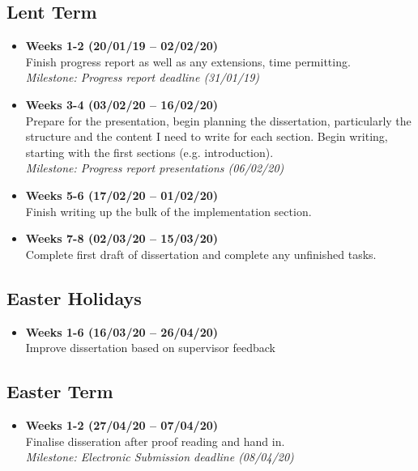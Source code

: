 \subsection*{Lent Term}
\begin{itemize}
      \item \textbf{Weeks 1-2 (20/01/19 -- 02/02/20)}\\ Finish progress report as well as any extensions, time permitting.
            \\ \textit{Milestone: Progress report deadline (31/01/19)}
      \item \textbf{Weeks 3-4 (03/02/20 -- 16/02/20)}\\ Prepare for the presentation, begin planning the dissertation, particularly the structure and the content I need to write for each section. Begin writing, starting with the first sections (e.g. introduction).
            \\ \textit{Milestone: Progress report presentations (06/02/20)}
      \item \textbf{Weeks 5-6 (17/02/20 -- 01/02/20)}\\ Finish writing up the bulk of the implementation section.
      \item \textbf{Weeks 7-8 (02/03/20 -- 15/03/20)}\\ Complete first draft of dissertation and complete any unfinished tasks.
\end{itemize}
\subsection*{Easter Holidays}
\begin{itemize}
      \item \textbf{Weeks 1-6 (16/03/20 -- 26/04/20)}\\ Improve dissertation based on supervisor feedback
\end{itemize}
\subsection*{Easter Term}
\begin{itemize}
      \item \textbf{Weeks 1-2 (27/04/20 -- 07/04/20)}\\ Finalise disseration after proof reading and hand in.
            \\ \textit{Milestone: Electronic Submission deadline (08/04/20)}
\end{itemize}


